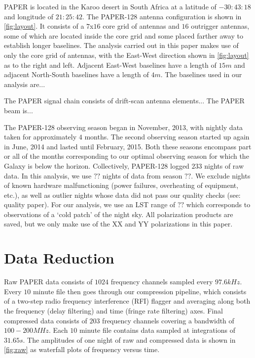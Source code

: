 \documentclass[preprint2,numberedappendix,tighten,twocolappendix]{aastex6}  %
\begin{document}
PAPER is located in the Karoo desert in South Africa at a latitude of $-30:43:18$ and longitude of $21:25:42$. The PAPER-128 antenna configuration is shown in \ref{fig:layout}. It consists of a $7$x$16$ core grid of antennas and $16$ outrigger antennas, some of which are located inside the core grid and some placed farther away to establish longer baselines. The analysis carried out in this paper makes use of only the core grid of antennas, with the East-West direction shown in \ref{fig:layout} as to the right and left. Adjacent East-West baselines have a length of $15 m$ and adjacent North-South baselines have a length of $4 m$. The baselines used in our analysis are...

The PAPER signal chain consists of drift-scan antenna elements...
The PAPER beam is...

The PAPER-128 observing season began in November, 2013, with nightly data taken for approximately $4$ months. The second observing season started up again in June, 2014 and lasted until February, 2015. Both these seasons encompass part or all of the months corresponding to our optimal observing season for which the Galaxy is below the horizon. Collectively, PAPER-128 logged $233$ nights of raw data. In this analysis, we use $??$ nights of data from season $??$. We exclude nights of known hardware malfunctioning (power failures, overheating of equipment, etc.), as well as outlier nights whose data did not pass our quality checks (see: quality paper). For our analysis, we use an LST range of $??$ which corresponds to observations of a `cold patch' of the night sky. All polarization products are saved, but we only make use of the XX and YY polarizations in this paper.

\section{Data Reduction}
\label{sec:Cal}

Raw PAPER data consists of $1024$ frequency channels sampled every $97.6 kHz$. Every $10$ minute file then goes through our compression pipeline, which consists of a two-step radio frequency interference (RFI) flagger and averaging along both the frequency (delay filtering) and time (fringe rate filtering) axes. Final compressed data consists of $203$ frequency channels covering a bandwidth of $100-200 MHz$. Each $10$ minute file contains data sampled at integrations of $31.65 s$. The amplitudes of one night of raw and compressed data is shown in \ref{fig:raw} as waterfall plots of frequency versus time. 
\end{document}
